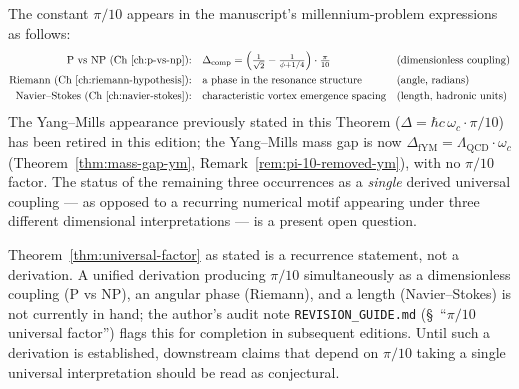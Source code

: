 \begin{theorem}\label{thm:universal-factor}
The constant $\pi/10$ appears in the manuscript's millennium-problem expressions as follows:
\begin{align}
\text{P vs NP (Ch~\ref{ch:p-vs-np}):} \quad & \Delta_{\text{comp}} = \left(\tfrac{1}{\sqrt{2}} - \tfrac{1}{\phi+1/4}\right) \cdot \tfrac{\pi}{10} && \text{(dimensionless coupling)}\\
\text{Riemann (Ch~\ref{ch:riemann-hypothesis}):} \quad & \text{a phase in the resonance structure} && \text{(angle, radians)}\\
\text{Navier--Stokes (Ch~\ref{ch:navier-stokes}):} \quad & \text{characteristic vortex emergence spacing} && \text{(length, hadronic units)}
\end{align}
The Yang--Mills appearance previously stated in this Theorem ($\Delta = \hbar c\,\omega_c \cdot \pi/10$) has been retired in this edition; the Yang--Mills mass gap is now $\Delta_{\mathrm{fYM}} = \Lambda_{\mathrm{QCD}} \cdot \omega_c$ (Theorem~\ref{thm:mass-gap-ym}, Remark~\ref{rem:pi-10-removed-ym}), with no $\pi/10$ factor. The status of the remaining three occurrences as a \emph{single} derived universal coupling — as opposed to a recurring numerical motif appearing under three different dimensional interpretations — is a present open question.
\end{theorem}

\begin{remark}\label{rem:universality-status}
Theorem~\ref{thm:universal-factor} as stated is a recurrence statement, not a derivation. A unified derivation producing $\pi/10$ simultaneously as a dimensionless coupling (P vs NP), an angular phase (Riemann), and a length (Navier--Stokes) is not currently in hand; the author's audit note \texttt{REVISION\_GUIDE.md} (\S~``$\pi/10$ universal factor'') flags this for completion in subsequent editions. Until such a derivation is established, downstream claims that depend on $\pi/10$ taking a single universal interpretation should be read as conjectural.
\end{remark}

